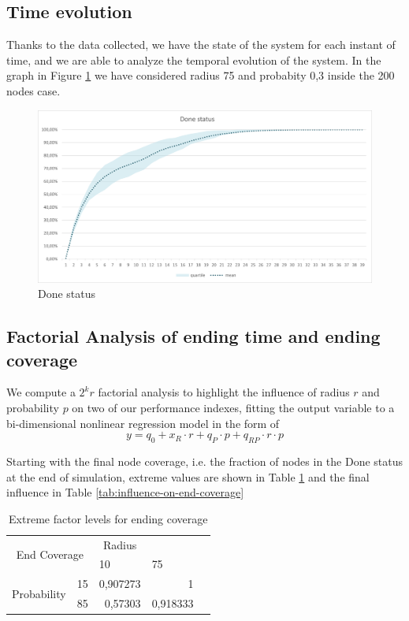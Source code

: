 \subsection{Time evolution}
Thanks to the data collected, we have the state of the system for each instant of time, and we are able to analyze the temporal evolution of the system. In the graph in Figure \ref{fig:done-status} we have considered radius 75 and probabity 0,3 inside the 200 nodes case.
\begin{figure}[H]
\centering
    \includegraphics[width= 1\textwidth]{./images/DoneStatus_200N-30p75r.png}
    \caption{Done status}
    \label{fig:done-status}
\end{figure}

\subsection{Factorial Analysis of ending time and ending coverage}

We compute a $2^kr$ factorial analysis to highlight the influence of radius $r$ and probability $p$ on two of our performance indexes, fitting the output variable to a bi-dimensional nonlinear regression model in the form of 
$$
y = q_0 + x_R \cdot r + q_P \cdot p + q_{RP} \cdot r \cdot p
$$

Starting with the final node coverage, i.e. the fraction of nodes in the Done status at the end of simulation, extreme values are shown in Table \ref{tab:extreme-factors-end-coverage} and the final influence in Table \ref{tab:influence-on-end-coverage}

\begin{table}[H]
\centering
\begin{tabular}{|cl|r|r|l}
\cline{1-4}
\multicolumn{2}{|c|}{\multirow{2}{*}{End Coverage}}     & \multicolumn{1}{c|}{Radius} & \multicolumn{1}{c|}{}   &  \\ \cline{3-4}
\multicolumn{2}{|c|}{}                                  & \multicolumn{1}{l|}{10}     & \multicolumn{1}{l|}{75} &  \\ \cline{1-4}
\multicolumn{1}{|c|}{\multirow{2}{*}{Probability}} & 15 & 0,907273                    & 1                       &  \\ \cline{2-4}
\multicolumn{1}{|c|}{}                             & 85 & 0,57303                     & 0,918333                &  \\ \cline{1-4}
\end{tabular}
\caption{Extreme factor levels for ending coverage}
\label{tab:extreme-factors-end-coverage}
\end{table}

